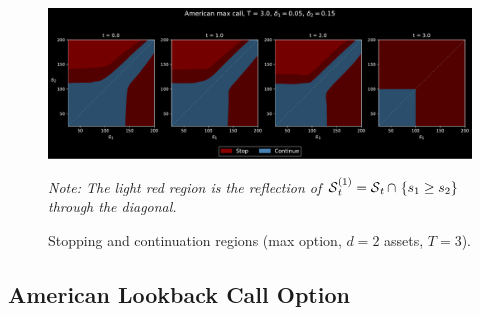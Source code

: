 
\begin{figure}[H]
    \centering
    \caption{Stopping and continuation regions (max option, $d=2$ assets, $T=3$).}
    \includegraphics[scale = 0.42]{Figures/AsymCropped Max Call, d = 2, N = 9 (4 dates).pdf}
    \label{fig:asymCall}
    
    \scriptsize{
\textit{Note: The light red region is the reflection of $\operatorname{\mathcal{S}}_t^{(1)} = \operatorname{\mathcal{S}}_t \cap \ \{s_1 \ge s_2\}$ through the diagonal. %
}} %
\end{figure}


\subsection{American Lookback Call Option} \label{sec:Lkbk}



